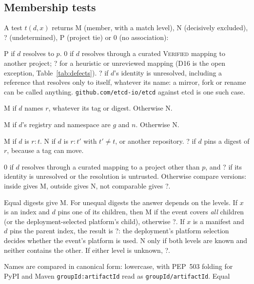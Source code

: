 \documentclass[11pt,a4paper]{article}
\newcommand{\code}[1]{\texttt{#1}}
\newcommand{\Mem}{\textsf{M}}
\newcommand{\Non}{\textsf{N}}
\newcommand{\Ind}{\textsf{?}}
\newcommand{\Proj}{\textsf{P}}
\newcommand{\NoA}{\textsf{0}}
\begin{document}
\subsection{Membership tests}
\label{sec:tests}
A test $t(d,x)$ returns \Mem{} (member, with a match level), \Non{}
(decisively excluded), \Ind{} (undetermined), \Proj{} (project tie)
or \NoA{} (no association):
\begin{description}[leftmargin=*,font=\normalfont\itshape,nosep]
  \item[Project.] \Proj{} if $d$ resolves to $p$. \NoA{} if $d$
    resolves through a curated \textsc{Verified} mapping to another
    project; \Ind{} for a heuristic or unreviewed mapping (D16 is the
    open exception, Table~\ref{tab:defects}). \Ind{} if $d$'s identity is unresolved, including a reference that
    resolves only to itself, whatever its name: a mirror, fork or
    rename can be called anything. \code{github.com/etcd-io/etcd}
    against etcd is one such case.
  \item[Repository.] \Mem{} if $d$ names $r$, whatever its tag or
    digest. Otherwise \Non{}.
  \item[Namespace.] \Mem{} if $d$'s registry and namespace are $g$ and
    $n$. Otherwise \Non{}.
  \item[Tag.] \Mem{} if $d$ is $r{:}t$. \Non{} if $d$ is $r{:}t'$ with
    $t' \ne t$, or another repository. \Ind{} if $d$ pins a digest of
    $r$, because a tag can move.
  \item[Release line.] \NoA{} if $d$ resolves through a curated
    mapping to a project other than $p$, and \Ind{} if its identity is
    unresolved or the resolution is untrusted. Otherwise compare versions: inside gives
    \Mem{}, outside gives \Non{}, not comparable gives \Ind{}.
  \item[Object.] Equal digests give \Mem{}. For unequal digests the
    answer depends on the levels. If $x$ is an index and $d$ pins one
    of its children, then \Mem{} if the event covers \emph{all}
    children (or the deployment-selected platform's child), otherwise
    \Ind{}. If $x$ is a manifest and $d$ pins the parent index, the
    result is \Ind{}: the deployment's platform selection decides
    whether the event's platform is used. \Non{} only if both levels
    are known and neither contains the other. If either level is
    unknown, \Ind{}.
  \item[Package, registry.] Names are compared in canonical form:
    lowercase, with PEP~503 folding for PyPI and Maven
    \code{groupId:artifactId} read as \code{groupId/artifactId}. Equal

\end{description}
\end{document}
